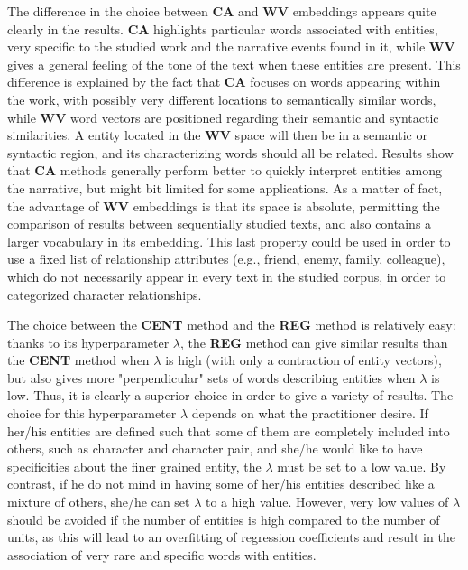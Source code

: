 \documentclass[
twocolumn,
]{ceurart}
\begin{document}
The difference in the choice between \textbf{CA} and \textbf{WV} embeddings appears quite clearly in the results. \textbf{CA} highlights particular words associated with entities, very specific to the studied work and the narrative events found in it, while \textbf{WV} gives a general feeling of the tone of the text when these entities are present. This difference is explained by the fact that \textbf{CA} focuses on words appearing within the work, with possibly very different locations to semantically similar words, while \textbf{WV} word vectors are positioned regarding their semantic and syntactic similarities. A entity located in the \textbf{WV} space will then be in a semantic or syntactic region, and its characterizing words should all be related. Results show that \textbf{CA} methods generally perform better to quickly interpret entities among the narrative, but might bit limited for some applications. As a matter of fact, the advantage of \textbf{WV} embeddings is that its space is absolute, permitting the comparison of results between sequentially studied texts, and also contains a larger vocabulary in its embedding. This last property could be used in order to use a fixed list of relationship attributes (e.g., friend, enemy, family, colleague), which do not necessarily appear in every text in the studied corpus, in order to categorized character relationships.

The choice between the \textbf{CENT} method and the \textbf{REG} method is relatively easy: thanks to its hyperparameter $\lambda$, the \textbf{REG} method can give similar results than the \textbf{CENT} method when $\lambda$ is high (with only a contraction of entity vectors), but also gives more "perpendicular" sets of words describing entities when $\lambda$ is low. Thus, it is clearly a superior choice in order to give a variety of results. The choice for this hyperparameter $\lambda$ depends on what the practitioner desire. If her/his entities are defined such that some of them are completely included into others, such as character and character pair, and she/he would like to have specificities about the finer grained entity, the $\lambda$ must be set to a low value. By contrast, if he do not mind in having some of her/his entities described like a mixture of others, she/he can set $\lambda$ to a high value. However, very low values of $\lambda$ should be avoided if the number of entities is high compared to the number of units, as this will lead to an overfitting of regression coefficients and result in the association of very rare and specific words with entities.
\end{document}
